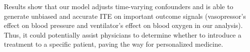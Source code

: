 Results show that our model adjusts time-varying confounders and is able to generate unbiased and accurate ITE on important outcome signals (vasopressor's effect on blood pressure and ventilator's effect on blood oxygen in our analysis). Thus, it could potentially assist physicians to determine whether to introduce a treatment to a specific patient, paving the way for personalized medicine.



